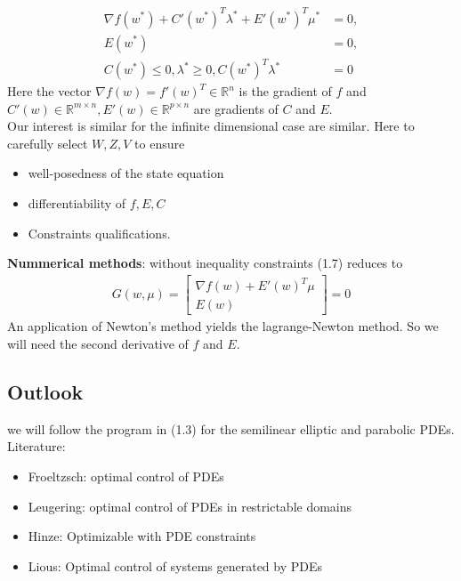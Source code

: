 \documentclass[a4paper,11pt,fleqn]{book}
\theoremstyle{definition}
\theoremstyle{remark}
\begin{document}
\begin{equation}
\begin{aligned}
	\nabla f(w^*) + C'(w^*)^T \lambda^* + E'(w^*)^T \mu^* &= 0, \\
	E(w^*) &= 0, \\
	C(w^*) \le 0, \lambda^* \geq 0, C(w^*)^T \lambda ^* &= 0
\end{aligned}
\end{equation}
Here the vector $\nabla f(w) = f'(w)^T \in \mathbb{R}^n$ is the gradient of $f$ and $C'(w) \in \mathbb{R}^{m \times n}, E'(w) \in \mathbb{R}^{p \times n}$ are gradients of $C$ and $E$. \\
Our interest is similar for the infinite dimensional case are similar. Here to carefully select $W, Z, V$ to ensure 
\begin{itemize}
	\item well-posedness of the state equation
	\item differentiability of $f, E, C$ 
	\item Constraints qualifications. 
\end{itemize}
\textbf{Nummerical methods}: without inequality constraints (1.7) reduces to 
\begin{align}
	G(w, \mu) = 
	\begin{bmatrix}
		\nabla f(w) + E'(w)^T\mu\\
		E(w)
	\end{bmatrix}
	= 0
\end{align}
An application of Newton's method yields the lagrange-Newton method. So we will need the second derivative of $f$ and $E$. 


\subsection{Outlook}
we will follow the program in (1.3) for the semilinear elliptic and parabolic PDEs. \\
Literature:
\begin{itemize}
  \item Froeltzsch: optimal control of PDEs
  \item Leugering: optimal control of PDEs in restrictable domains
  \item Hinze: Optimizable with PDE constraints
  \item Lious: Optimal control of systems generated by PDEs
\end{itemize}
\end{document}

